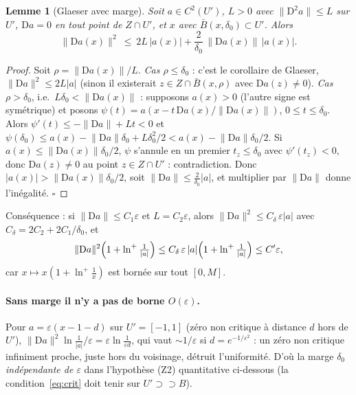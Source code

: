 \documentclass[11pt,a4paper]{article}
\newtheorem{lemme}[theoreme]{Lemme}
\theoremstyle{remark}
\newcommand{\D}{\mathrm D}
\begin{document}
\begin{lemme}[Glaeser avec marge]\label{lem:marge}
Soit $a\in C^2(U')$, $L>0$ avec $\lVert\D^2a\rVert\le L$ sur $U'$, $\D a=0$ en tout point de $Z\cap U'$, et $x$ avec $\bar B(x,\delta_0)\subset U'$. Alors
\[
\lVert\D a(x)\rVert^2\ \le\ 2L\,\lvert a(x)\rvert+\frac{2}{\delta_0}\,\lVert\D a(x)\rVert\,\lvert a(x)\rvert .
\]
\end{lemme}
\begin{proof}
Soit $\rho=\lVert\D a(x)\rVert/L$. \emph{Cas $\rho\le\delta_0$} : c'est le corollaire de Glaeser, $\lVert\D a\rVert^2\le2L\lvert a\rvert$ (sinon il existerait $z\in Z\cap\bar B(x,\rho)$ avec $\D a(z)\ne0$). \emph{Cas $\rho>\delta_0$}, i.e.\ $L\delta_0<\lVert\D a(x)\rVert$ : supposons $a(x)>0$ (l'autre signe est symétrique) et posons $\psi(t)=a(x-t\,\D a(x)/\lVert\D a(x)\rVert)$, $0\le t\le\delta_0$. Alors $\psi'(t)\le-\lVert\D a\rVert+Lt<0$ et $\psi(\delta_0)\le a(x)-\lVert\D a\rVert\delta_0+L\delta_0^2/2<a(x)-\lVert\D a\rVert\delta_0/2$. Si $a(x)\le\lVert\D a(x)\rVert\delta_0/2$, $\psi$ s'annule en un premier $t_z\le\delta_0$ avec $\psi'(t_z)<0$, donc $\D a(z)\ne0$ au point $z\in Z\cap U'$ : contradiction. Donc $\lvert a(x)\rvert>\lVert\D a(x)\rVert\delta_0/2$, soit $\lVert\D a\rVert\le\frac2{\delta_0}\lvert a\rvert$, et multiplier par $\lVert\D a\rVert$ donne l'inégalité. $\square$
\end{proof}
\noindent Conséquence : si $\lVert\D a\rVert\le C_1\varepsilon$ et $L=C_2\varepsilon$, alors $\lVert\D a\rVert^2\le C_\delta\,\varepsilon\lvert a\rvert$ avec $C_\delta=2C_2+2C_1/\delta_0$, et
\[
\lVert\D a\rVert^2\Bigl(1+\ln^+\tfrac1{\lvert a\rvert}\Bigr)\le C_\delta\,\varepsilon\,\lvert a\rvert\Bigl(1+\ln^+\tfrac1{\lvert a\rvert}\Bigr)\le C'\varepsilon,
\]
car $x\mapsto x(1+\ln^+\frac1x)$ est bornée sur tout $[0,M]$.

\paragraph{Sans marge il n'y a pas de borne $O(\varepsilon)$.} Pour $a=\varepsilon(x-1-d)$ sur $U'=[-1,1]$ (zéro non critique à distance $d$ hors de $U'$), $\lVert\D a\rVert^2\ln\frac1{\lvert a\rvert}/\varepsilon=\varepsilon\ln\frac1{\varepsilon d}$, qui vaut $\sim1/\varepsilon$ si $d=e^{-1/\varepsilon^2}$ : un zéro non critique infiniment proche, juste hors du voisinage, détruit l'uniformité. D'où la marge $\delta_0$ \emph{indépendante de $\varepsilon$} dans l'hypothèse (Z2) quantitative ci-dessous (la condition~\eqref{eq:crit} doit tenir sur $U'\supset\supset B$).
\end{document}
